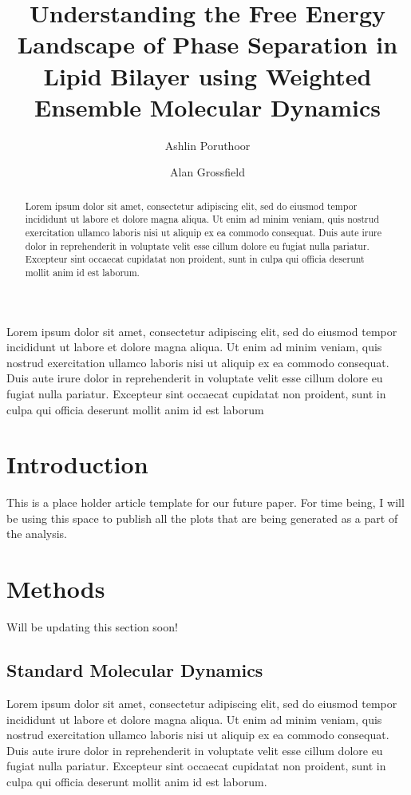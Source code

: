 \documentclass{biophys-new}
\title{Understanding the Free Energy Landscape of Phase Separation in Lipid Bilayer using Weighted Ensemble Molecular Dynamics}
\author[1]{Ashlin Poruthoor}
\author[1,*]{Alan Grossfield}
\affil[1]{University of Rochester Medical Center, Rochester, NY 14620}
\begin{document}
\begin{frontmatter}
\begin{abstract}

Lorem ipsum dolor sit amet, consectetur adipiscing elit, sed do eiusmod tempor incididunt ut labore et dolore magna aliqua. Ut enim ad minim veniam, quis nostrud exercitation ullamco laboris nisi ut aliquip ex ea commodo consequat. Duis aute irure dolor in reprehenderit in voluptate velit esse cillum dolore eu fugiat nulla pariatur. Excepteur sint occaecat cupidatat non proident, sunt in culpa qui officia deserunt mollit anim id est laborum.

\end{abstract}

\begin{sigstatement}

Lorem ipsum dolor sit amet, consectetur adipiscing elit, sed do eiusmod tempor incididunt ut labore et dolore magna aliqua. Ut enim ad minim veniam, quis nostrud exercitation ullamco laboris nisi ut aliquip ex ea commodo consequat. Duis aute irure dolor in reprehenderit in voluptate velit esse cillum dolore eu fugiat nulla pariatur. Excepteur sint occaecat cupidatat non proident, sunt in culpa qui officia deserunt mollit anim id est laborum

\end{sigstatement}

\end{frontmatter}

\section*{Introduction}

This is a place holder article template for our future paper. For time being, I will be using this 
space to publish all the plots that are being generated as a part of the analysis.

\section*{Methods}

Will be updating this section soon!

\subsection*{Standard Molecular Dynamics}

Lorem ipsum dolor sit amet, consectetur adipiscing elit, sed do eiusmod tempor incididunt ut labore et dolore magna aliqua. Ut enim ad minim veniam, quis nostrud exercitation ullamco laboris nisi ut aliquip ex ea commodo consequat. Duis aute irure dolor in reprehenderit in voluptate velit esse cillum dolore eu fugiat nulla pariatur. Excepteur sint occaecat cupidatat non proident, sunt in culpa qui officia deserunt mollit anim id est laborum.
\end{document}
